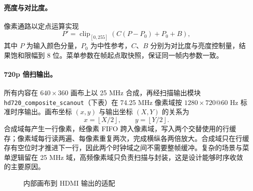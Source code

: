\paragraph{亮度与对比度。}像素通路以定点运算实现
\begin{equation}
P'=\operatorname{clip}_{[0,255]}\!\left(C(P-P_0)+P_0+B\right),
\end{equation}
其中 $P$ 为输入颜色分量，$P_0$ 为中性参考，$C$、$B$ 分别为对比度与亮度控制量，结果饱和限幅到 8 位。菜单参数在帧起点取快照，保证同一帧内参数一致。

\paragraph{720p 倍扫输出。}所有内容在 $640\times360$ 画布上以 25 MHz 合成，再经扫描输出模块 \texttt{hd720\_composite\_scanout}（下表）在 74.25 MHz 像素域按 $1280\times720$@60 Hz 标准时序输出。画布坐标 $(x,y)$ 与输出坐标 $(X,Y)$ 的关系为
\begin{equation}
x=\left\lfloor X/2\right\rfloor,\qquad y=\left\lfloor Y/2\right\rfloor .
\end{equation}
合成域每产生一行像素，经像素 FIFO 跨入像素域，写入两个交替使用的行缓存；像素域每行读两遍、每像素重复两次，完成横纵各两倍放大。合成域只在行缓存有空位时才推进下一行，因此两个时钟域之间不需要整帧缓冲。复杂的场景与菜单逻辑留在 25 MHz 域，高频像素域只负责扫描与封装，这是设计能够时序收敛的主要原因。

\begin{figure}[H]\centering
{}
\caption{内部画布到 HDMI 输出的适配}\label{fig:720}
\end{figure}

